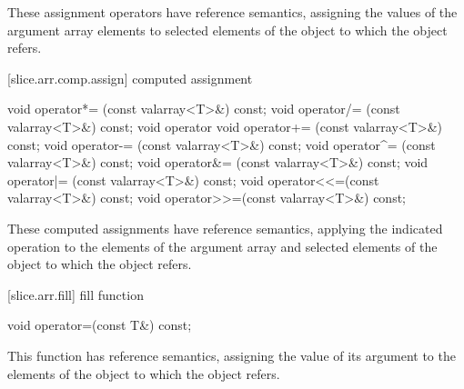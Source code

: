 \begin{itemdescr}
\pnum
These assignment operators have reference semantics,
assigning the values of the argument array elements to selected
elements of the
object to which the
object refers.
\end{itemdescr}

[slice.arr.comp.assign]{ computed assignment}

%
%
%
%
%
%
%
%
%
%
\begin{itemdecl}
void operator*= (const valarray<T>&) const;
void operator/= (const valarray<T>&) const;
void operator%
void operator+= (const valarray<T>&) const;
void operator-= (const valarray<T>&) const;
void operator^= (const valarray<T>&) const;
void operator&= (const valarray<T>&) const;
void operator|= (const valarray<T>&) const;
void operator<<=(const valarray<T>&) const;
void operator>>=(const valarray<T>&) const;
\end{itemdecl}

\begin{itemdescr}
\pnum
These computed assignments have reference semantics, applying the
indicated operation to the elements of the argument array
and selected elements of the
object to which the
object refers.
\end{itemdescr}

[slice.arr.fill]{ fill function}

%
\begin{itemdecl}
void operator=(const T&) const;
\end{itemdecl}

\begin{itemdescr}
\pnum
This function has reference semantics, assigning the value of its argument
to the elements of the
object to which the
object refers.
\end{itemdescr}

